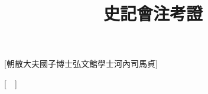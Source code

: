 \documentclass[dvipdfmx]{ShiJiAntiqueStyle}
\title{史記會注考證}
\author{}
\date{}
\begin{document}
  \setcounter{frame}{1}
  \setcounter{page}{1}
  \pagestyle{preShiji}\MakeFrame\mainfont
  \begin{withgezhu}
    [朝散大夫國子博士弘文館學士河內司馬貞]
      
    [　]
      
  \end{withgezhu}
\end{document}
